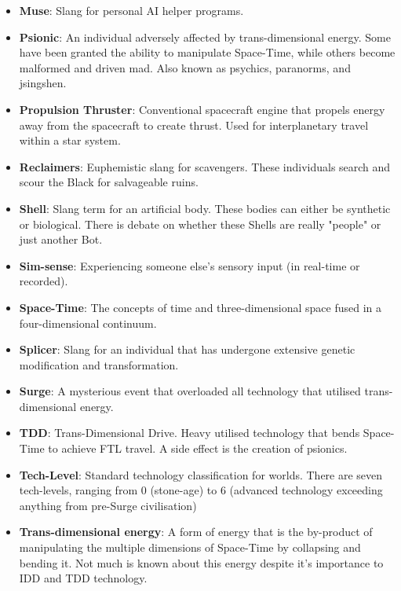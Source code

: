 \documentclass[10pt,twoside]{article}
\begin{document}
\begin{multicols}{2}
\begin{itemize}
    \item \textbf{Muse}: Slang for personal AI helper programs.

    \item \textbf{Psionic}: An individual adversely affected by trans-dimensional energy. Some have been granted the ability to manipulate Space-Time, while others become malformed and driven mad. Also known as psychics, paranorms, and jsingshen.

    \item \textbf{Propulsion Thruster}: Conventional spacecraft engine that propels energy away from the spacecraft to create thrust. Used for interplanetary travel within a star system.

    \item \textbf{Reclaimers}: Euphemistic slang for scavengers. These individuals search and scour the Black for salvageable ruins.

    \item \textbf{Shell}: Slang term for an artificial body. These bodies can either be synthetic or biological. There is debate on whether these Shells are really "people" or just another Bot.

    \item \textbf{Sim-sense}: Experiencing someone else's sensory input (in real-time or recorded).

    \item \textbf{Space-Time}: The concepts of time and three-dimensional space fused in a four-dimensional continuum.

    \item \textbf{Splicer}: Slang for an individual that has undergone extensive genetic modification and transformation.

    \item \textbf{Surge}: A mysterious event that overloaded all technology that utilised trans-dimensional energy.

    \item \textbf{TDD}: Trans-Dimensional Drive. Heavy utilised technology that bends Space-Time to achieve FTL travel. A side effect is the creation of psionics.

    \item \textbf{Tech-Level}: Standard technology classification for worlds. There are seven tech-levels, ranging from 0 (stone-age) to 6 (advanced technology exceeding anything from pre-Surge civilisation)

    \item \textbf{Trans-dimensional energy}: A form of energy that is the by-product of manipulating the multiple dimensions of Space-Time by collapsing and bending it. Not much is known about this energy despite it's importance to IDD and TDD technology.


\end{itemize}
\end{multicols}
\end{document}
